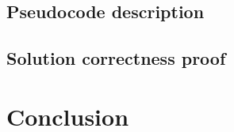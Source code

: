 \subsection{Pseudocode description}
\subsection{Solution correctness proof}

\section{Conclusion}


%

